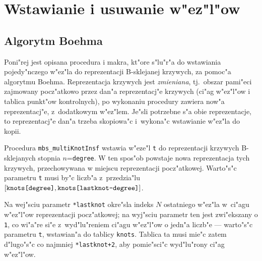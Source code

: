 

\newpage
\section{Wstawianie i usuwanie w"ez"l"ow}

\subsection{\label{ssect:knot:ins}Algorytm Boehma}

Poni"rej jest opisana procedura i makra, kt"ore s"lu"r"a do wstawiania
pojedy"nczego w"ez"la do reprezentacji B-sklejanej krzywych, za pomoc"a
algorytmu Boehma. Reprezentacja krzywych jest \emph{zmieniana}, tj.\ obszar
pami"eci zajmowany pocz"atkowo przez dan"a reprezentacj"e krzywych (ci"ag
w"ez"l"ow i tablica punkt"ow kontrolnych), po wykonaniu procedury zawiera
now"a reprezentacj"e, z~dodatkowym w"ez"lem. Je"sli potrzebne s"a obie
reprezentacje, to reprezentacj"e dan"a trzeba skopiowa"c i~wykona"c
wstawianie w"ez"la do kopii.

\vspace{\bigskipamount}
Procedura \texttt{mbs\_multiKnotInsf} wstawia w"eze"l \texttt{t} do
reprezentacji krzywych B-skle\-ja\-nych stopnia $n$=\texttt{degree}.
W ten spos"ob powstaje nowa
reprezentacja tych krzywych, przechowywana w miejscu reprezentacji
pocz"atkowej. Warto"s"c parametru \texttt{t} musi by"c liczb"a z~przedzia"lu
$[\mbox{\texttt{knots[degree]}},\mbox{\texttt{knots[lastknot-degree]}}]$.

Na wej"sciu parametr \texttt{*lastknot} okre"sla indeks $N$ ostatniego w"ez"la
w~ci"agu w"ez"l"ow reprezentacji pocz"atkowej; na wyj"sciu parametr ten jest
zwi"ekszany o \texttt{1}, co wi"a"re si"e z~wyd"lu"reniem ci"agu w"ez"l"ow o
jedn"a liczb"e --- warto"s"c parametru \texttt{t}, wstawian"a do tablicy
\texttt{knots}. Tablica ta musi mie"c zatem d"lugo"s"c co najmniej
\texttt{*lastknot+2}, aby pomie"sci"c wyd"lu"rony ci"ag w"ez"l"ow.

